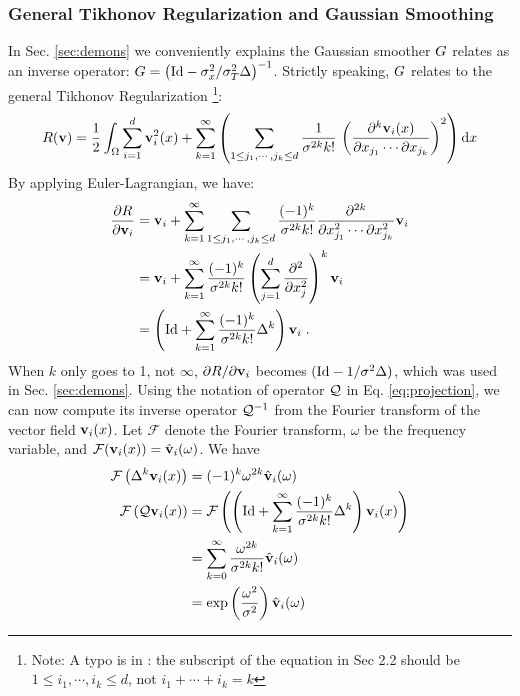 \documentclass[letterpaper,12pt]{article}
\begin{document}
\subsubsection*{General Tikhonov Regularization and Gaussian Smoothing}
\label{sec:gaussian}
In Sec. \ref{sec:demons} we conveniently explains the Gaussian smoother ${G}$ relates as an inverse operator: ${G} = \left( \text{Id} - {\sigma_x^2}/{\sigma_T^2} \Delta \right)^{-1}$. Strictly speaking, ${G}$ relates to the general Tikhonov Regularization \cite{Nielsen1997,Mansi2010}\footnote{Note: A typo is in \cite{Mansi2010}: the subscript of the equation in Sec 2.2 should be $1 \leq i_1, \cdots, i_k \leq d$, not $i_1 + \cdots + i_k=k$}:
\begin{align}
R(\mathbf{v}) = \frac{1}{2} \int_\Omega \sum_{i=1}^d
\mathbf{v}_i^2(x) + 
\sum_{k=1}^{\infty}
\left(
\sum_{1 \leq j_1, \cdots, j_k \leq d}
\frac{1}{\sigma^{2k} k!} \,
\left(
\frac{\partial^k \mathbf{v}_i(x)}{\partial x_{j_1} \cdots \partial x_{j_k}}
\right)^2
\right)
\text{d} x
\end{align}
By applying Euler-Lagrangian, we have:
\begin{equation}
\begin{split}
\frac{\partial R}{\partial \mathbf{v}_i} & = \mathbf{v}_i 
+ \sum_{k=1}^{\infty} 
\sum_{1 \leq j_1, \cdots, j_k \leq d}
\frac{(-1)^k}{\sigma^{2k}k!}
\frac{\partial^{2k}}{\partial x^2_{j_1} \cdots \partial x^2_{j_k}} \mathbf{v}_i \\
& =
\mathbf{v}_i 
+ \sum_{k=1}^{\infty} 
\frac{(-1)^k}{\sigma^{2k}k!}
\left(
\sum_{j=1}^{d}
\frac{\partial^{2}}{\partial x^2_{j}}  
\right)^k \mathbf{v}_i
\\
& = 
\left(
\text{Id} + \sum_{k=1}^{\infty} 
\frac{(-1)^k}{\sigma^{2k}k!}
\Delta^k
\right) \mathbf{v}_i \;.
\end{split}
\end{equation}
When $k$ only goes to 1, not $\infty$, $\partial R / \partial \mathbf{v}_i$ becomes $(\text{Id} - 1/\sigma^2 \Delta)$, which was used in Sec. \ref{sec:demons}. Using the notation of operator $\mathcal{Q}$ in Eq. \ref{eq:projection}, we can now compute its inverse operator $\mathcal{Q}^{-1}$ from the Fourier transform of the vector field $\mathbf{v}_i(x)$. Let $\mathcal{F}$ denote the Fourier transform, $\omega$ be the frequency variable, and $\mathcal{F}(\mathbf{v}_i(x)) = \hat{\mathbf{v}}_i(\omega)$. We have
\begin{equation}
\begin{split}
\mathcal{F}\left(
\Delta^k \mathbf{v}_i(x)
\right)
 & = (-1)^k \omega^{2k} \hat{\mathbf{v}}_i(\omega) 
\\
\mathcal{F}\left( \mathcal{Q} \mathbf{v}_i(x) \right) 
& = \mathcal{F}\left(
\left(
\text{Id} + \sum_{k=1}^{\infty} 
\frac{(-1)^k}{\sigma^{2k}k!}
\Delta^k
\right)
\mathbf{v}_i(x)
\right)
\\
& = 
\sum_{k=0}^{\infty} 
\frac{\omega^{2k}}{\sigma^{2k} k!} \hat{\mathbf{v}}_i(\omega)\\
& =
\exp \left(
\frac{\omega^2}{\sigma^2}
\right) \hat{\mathbf{v}}_i(\omega)
\end{split}
\end{equation}
\end{document}
